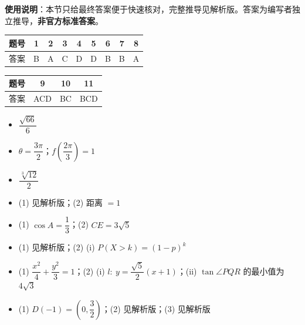 
\begin{gknotice}
\textbf{使用说明}：本节只给最终答案便于快速核对，完整推导见解析版。答案为编写者独立推导，\textbf{非官方标准答案}。
\end{gknotice}

\begin{center}\begin{tabular}{ccccccccc}
\toprule
题号 & 1 & 2 & 3 & 4 & 5 & 6 & 7 & 8 \\
\midrule
答案 & B & A & C & D & D & B & B & A \\
\bottomrule
\end{tabular}\end{center}

\begin{center}\begin{tabular}{cccc}
\toprule
题号 & 9 & 10 & 11 \\
\midrule
答案 & ACD & BC & BCD \\
\bottomrule
\end{tabular}\end{center}

\begin{itemize}[leftmargin=2.6em]
  \item[\textbf{12.}] $\dfrac{\sqrt{66}}{6}$
  \item[\textbf{13.}] $\theta=\dfrac{3\pi}{2}$；$f\left(\dfrac{2\pi}{3}\right)=1$
  \item[\textbf{14.}] $\dfrac{\sqrt[3]{12}}{2}$
\end{itemize}

\begin{itemize}[leftmargin=2.6em]
  \item[\textbf{15.}] (1) 见解析版；(2) 距离 $=1$
  \item[\textbf{16.}] (1) $\cos A=\dfrac13$；(2) $CE=3\sqrt5$
  \item[\textbf{17.}] (1) 见解析版；(2) (i) $P(X>k)=(1-p)^k$
  \item[\textbf{18.}] (1) $\dfrac{x^2}{4}+\dfrac{y^2}{3}=1$；(2) (i) $l:\ y=\dfrac{\sqrt5}{2}(x+1)$；(ii) $\tan\angle PQR$ 的最小值为 $4\sqrt3$
  \item[\textbf{19.}] (1) $D(-1)=\left(0,\dfrac32\right)$；(2) 见解析版；(3) 见解析版
\end{itemize}
